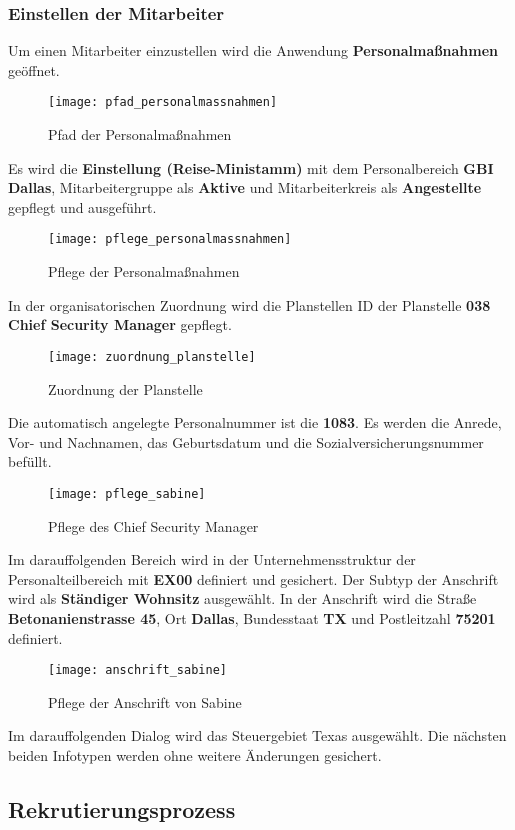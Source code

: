 \subsubsection{Einstellen der Mitarbeiter}
Um einen Mitarbeiter einzustellen wird die Anwendung \textbf{Personalmaßnahmen} geöffnet.
\begin{figure}[H]
	\centering
	\texttt{[image: pfad\_personalmassnahmen]}
	\caption{Pfad der Personalmaßnahmen}
	\label{fig:pfad_personalmassnahmen}
\end{figure}
Es wird die \textbf{Einstellung (Reise-Ministamm)} mit dem Personalbereich \textbf{GBI Dallas}, Mitarbeitergruppe als \textbf{Aktive} und Mitarbeiterkreis als \textbf{Angestellte} gepflegt und ausgeführt.
\begin{figure}[H]
	\centering
	\texttt{[image: pflege\_personalmassnahmen]}
	\caption{Pflege der Personalmaßnahmen}
	\label{fig:pflege_personalmassnahmen}
\end{figure}
In der organisatorischen Zuordnung wird die Planstellen ID der Planstelle \textbf{038 Chief Security Manager} gepflegt.
\begin{figure}[H]
	\centering
	\texttt{[image: zuordnung\_planstelle]}
	\caption{Zuordnung der Planstelle}
	\label{fig:zuordnung_planstelle}
\end{figure}
Die automatisch angelegte Personalnummer ist die \textbf{1083}. Es werden die Anrede, Vor- und Nachnamen, das Geburtsdatum und die Sozialversicherungsnummer befüllt.
\begin{figure}[H]
	\centering
	\texttt{[image: pflege\_sabine]}
	\caption{Pflege des Chief Security Manager}
	\label{fig:pflege_sabine}
\end{figure}
Im darauffolgenden Bereich wird in der Unternehmensstruktur der Personalteilbereich mit \textbf{EX00} definiert und gesichert. Der Subtyp der Anschrift wird als \textbf{Ständiger Wohnsitz} ausgewählt. In der Anschrift wird die Straße \textbf{Betonanienstrasse 45}, Ort \textbf{Dallas}, Bundesstaat \textbf{TX} und Postleitzahl \textbf{75201} definiert.
\begin{figure}[H]
	\centering
	\texttt{[image: anschrift\_sabine]}
	\caption{Pflege der Anschrift von Sabine}
	\label{fig:anschrift_sabine}
\end{figure}
Im darauffolgenden Dialog wird das Steuergebiet Texas ausgewählt. Die nächsten beiden Infotypen werden ohne weitere Änderungen gesichert.

\subsection{Rekrutierungsprozess}

